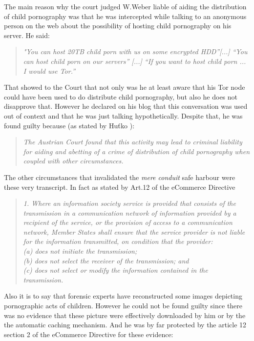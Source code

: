 \documentclass[runningheads,a4paper]{llncs}
\begin{document}
The main reason why the court judged W.Weber liable of aiding the distribution of child pornography was that he was intercepted while talking to an anonymous person on the web about the possibility of hosting child pornography on his server. He said: 
\begin{quote}
    \textit{ "You can host 20TB child porn with us on some encrypted HDD”[...] “You can host child porn on our servers” [...] “If you want to host child porn ... I would use Tor.”}
\end{quote}
That showed to the Court that not only was he at least aware that his Tor node could have been used to do distribute child pornography, but also he does not disapprove that.
However he declared on his blog that this conversation was used out of context and that he was just talking hypothetically. 
Despite that, he was found guilty because (as stated by Huťko \cite{HUSOVEC}):
\begin{quote}
\textit{
    The Austrian Court found that this activity may lead to criminal liability for aiding and abetting of a crime of distribution of child pornography when coupled with other circumstances.}
\end{quote}
The other circumstances that invalidated the \textit{mere conduit} safe harbour were these very transcript. In fact as stated by Art.12 of the eCommerce Directive 
\begin{quote}
    \textit{1. Where an information society service is provided that consists of the transmission in a communication network of information provided by a recipient of the service, or the provision of access to a communication network, Member States shall ensure that the service provider is not liable for the information transmitted, on condition that the provider:\\
(a) does not initiate the transmission;\\
(b) does not select the receiver of the transmission; and\\
(c) does not select or modify the information contained in the transmission.}
\end{quote}

Also it is to say that forensic experts have reconstructed some images depicting pornographic acts of children. However he could not be found guilty since there was no evidence that these picture were effectively downloaded by him or by the the automatic caching mechanism. And he was by far protected by the article 12 section 2 of the eCommerce Directive for these evidence:
\end{document}
